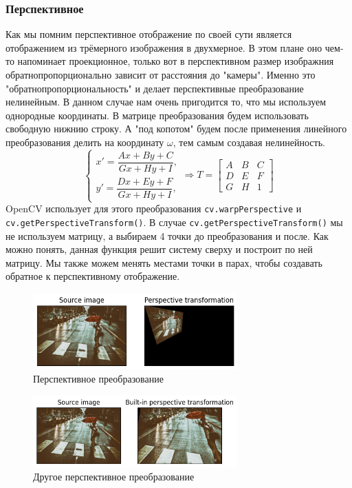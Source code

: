 \documentclass[a4paper,12pt]{article}
\begin{document}
\subsubsection{Перспективное}
Как мы помним перспективное отображение по своей сути является отображением из трёмерного изображения в двухмерное. В этом плане оно чем-то напоминает проекционное, только вот в перспективном размер изображния обратнопропорционально зависит от расстояния до "камеры". Именно это "обратнопропорциональность" и делает перспективные преобразование нелинейным. 
В данном случае нам очень пригодится то, что мы используем однородные  координаты. В матрице преобразования будем использовать свободную нижнию строку. А "под копотом" будем после применения линейного преобразования делить на координату $\omega$, тем самым создавая нелинейность. 
$$
	\begin{cases}
		x'=\dfrac{Ax+By+C}{Gx+Hy+I}, \\
		y'=\dfrac{Dx+Ey+F}{Gx+Hy+I},
	\end{cases}
	\Rightarrow
	T=
	\begin{bmatrix}
		A & B & C
		\\ D & E & F
		\\ G & H & 1
	\end{bmatrix}
$$
OpenCV использует для этого преобразования \texttt{cv.warpPerspective}
и \texttt{cv.getPerspectiveTransform()}. В случае  \texttt{cv.getPerspectiveTransform()} мы не используем матрицу, а выбираем 4 точки до преобразования и после. Как можно понять, данная функция решит систему сверху и построит по ней матрицу.
Мы также можем менять местами точки в парах, чтобы создавать обратное к перспективному отображение. 
\begin{figure}[H]
    \centering \includegraphics[width=0.7\textwidth]{my_images/31.png}
    \caption{Перспективное преобразование}
\end{figure}
\begin{figure}[H]
    \centering \includegraphics[width=0.7\textwidth]{my_images/32.png}
    \caption{Другое перспективное преобразование}
\end{figure}
\end{document}
